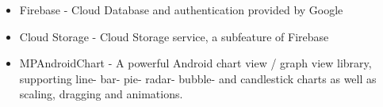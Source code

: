 \documentclass{article}
\begin{document}
        \hfill \break

        \begin{itemize}
            \item Firebase       - Cloud Database and authentication provided by Google
            \item Cloud Storage  - Cloud Storage service, a subfeature of Firebase
            \item MPAndroidChart - A powerful Android chart view / graph view library, supporting line- bar- pie- radar- bubble- and candlestick charts as well as scaling, dragging and animations.
        \end{itemize}
\end{document}
